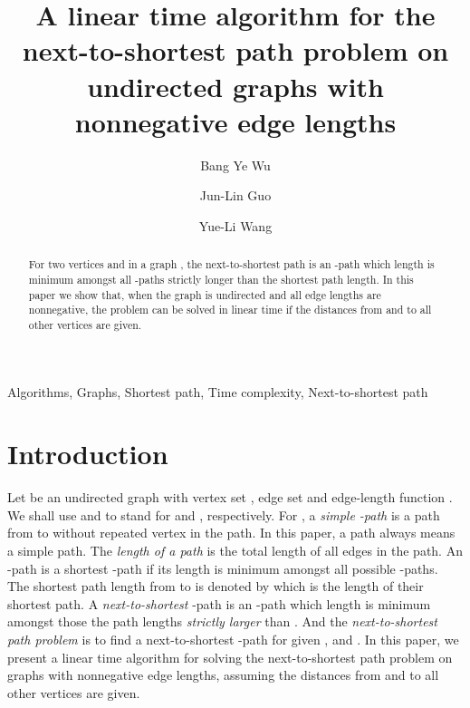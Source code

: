 \documentclass[review]{elsarticle}
\begin{document}
\begin{frontmatter}
\title{A linear time algorithm for the next-to-shortest path problem on undirected graphs with nonnegative edge lengths}
\author[bang]{Bang Ye Wu}
\author[yl]{Jun-Lin Guo}
\author[yl]{Yue-Li Wang}
\address[bang]{Dept. of Computer Science and Information Engineering,
National Chung Cheng University, ChiaYi, Taiwan 621, R.O.C.}
\address[yl]{Department of Information Management, National Taiwan University of Science and Technology, Taipei, Taiwan, R.O.C.}

\begin{abstract}
For two vertices  and  in a graph , the
next-to-shortest path is an -path which length is minimum
amongst all -paths strictly longer than the shortest path
length. In this paper we show that, when the graph is undirected and
all edge lengths are nonnegative,  the problem can be solved in
linear time if the distances from  and  to all other vertices
are given.
\end{abstract}

\begin{keyword}
Algorithms, Graphs, Shortest path, Time complexity, Next-to-shortest
path
\end{keyword}
\end{frontmatter}

\section{Introduction}
Let  be an undirected graph with vertex set , edge set
 and edge-length function . We shall use  and  to stand
for  and , respectively. For , a {\em simple
-path} is a path from  to  without repeated vertex in the
path. In this paper, a path always means a simple path. The {\em
length of a path} is the total length of all edges in the path. An
-path is a shortest -path if its length is minimum amongst
all possible -paths. The shortest path length from  to  is
denoted by  which is the length of their shortest path. A
\emph{next-to-shortest} -path is an -path which length is
minimum amongst those the path lengths \emph{strictly larger} than
. And the {\em next-to-shortest path problem} is to find a
next-to-shortest -path for given ,  and . In this
paper, we present a linear time algorithm for solving the
next-to-shortest path problem on graphs with nonnegative edge
lengths, assuming the distances from  and  to all other
vertices are given.
\end{document}
